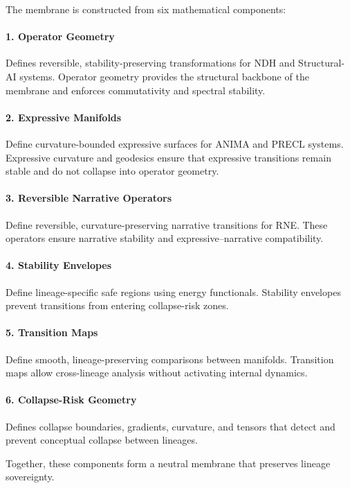 The membrane is constructed from six mathematical components:

\paragraph{1. Operator Geometry}  
Defines reversible, stability-preserving transformations for NDH and
Structural-AI systems. Operator geometry provides the structural backbone of the
membrane and enforces commutativity and spectral stability.

\paragraph{2. Expressive Manifolds}  
Define curvature-bounded expressive surfaces for ANIMA and PRECL systems.
Expressive curvature and geodesics ensure that expressive transitions remain
stable and do not collapse into operator geometry.

\paragraph{3. Reversible Narrative Operators}  
Define reversible, curvature-preserving narrative transitions for RNE. These
operators ensure narrative stability and expressive–narrative compatibility.

\paragraph{4. Stability Envelopes}  
Define lineage-specific safe regions using energy functionals. Stability
envelopes prevent transitions from entering collapse-risk zones.

\paragraph{5. Transition Maps}  
Define smooth, lineage-preserving comparisons between manifolds. Transition maps
allow cross-lineage analysis without activating internal dynamics.

\paragraph{6. Collapse-Risk Geometry}  
Defines collapse boundaries, gradients, curvature, and tensors that detect and
prevent conceptual collapse between lineages.

Together, these components form a neutral membrane that preserves lineage
sovereignty.

